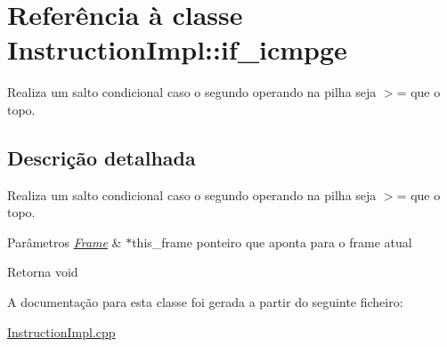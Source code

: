 \hypertarget{class_instruction_impl_1_1if__icmpge}{}\section{Referência à classe Instruction\+Impl\+:\+:if\+\_\+icmpge}
\label{class_instruction_impl_1_1if__icmpge}


Realiza um salto condicional caso o segundo operando na pilha seja $>$= que o topo.  




\subsection{Descrição detalhada}
Realiza um salto condicional caso o segundo operando na pilha seja $>$= que o topo. 


\begin{DoxyParams}{Parâmetros}
{\em \hyperlink{struct_frame}{Frame}} & $\ast$this\+\_\+frame ponteiro que aponta para o frame atual \\
\hline
\end{DoxyParams}
\begin{DoxyReturn}{Retorna}
void 
\end{DoxyReturn}


A documentação para esta classe foi gerada a partir do seguinte ficheiro\+:\begin{DoxyCompactItemize}
\item 
\hyperlink{_instruction_impl_8cpp}{Instruction\+Impl.\+cpp}\end{DoxyCompactItemize}
